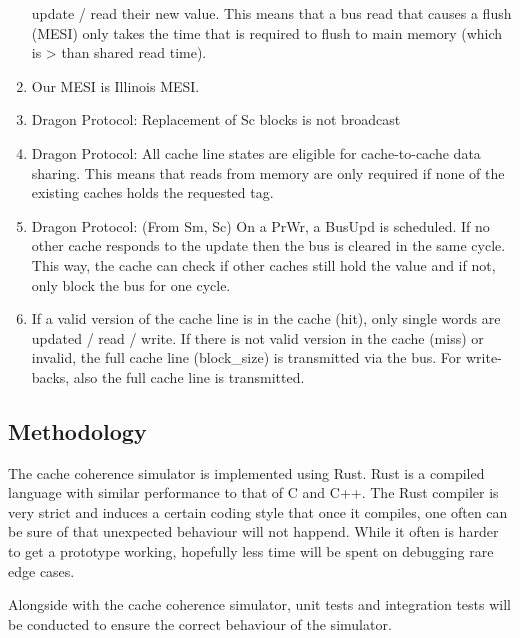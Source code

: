 \begin{enumerate}
          update / read their new value. This means that a bus read that causes a flush (MESI) only takes the
          time that is required to flush to main memory (which is > than shared read time).
    \item Our MESI is Illinois MESI.
    \item Dragon Protocol: Replacement of Sc blocks is not broadcast
    \item Dragon Protocol: All cache line states are eligible for cache-to-cache data sharing. This
          means that reads from memory are only required if none of the existing caches holds the requested
          tag.
    \item Dragon Protocol: (From Sm, Sc) On a PrWr, a BusUpd is scheduled. If no other cache responds to
          the update then the bus is cleared in the same cycle. This way, the cache can check if other caches
          still hold the value and if not, only block the bus for one cycle.
    \item If a valid version of the cache line is in the cache (hit), only single words are updated /
          read / write. If there is not valid version in the cache (miss) or invalid, the full cache line
          (block\_size) is transmitted via the bus. For write-backs, also the full cache line is transmitted.
\end{enumerate}
\subsection{Methodology}
The cache coherence simulator is implemented using Rust.
Rust is a compiled language with similar performance to that of C and C++.
The Rust compiler is very strict and induces a certain coding style that once it compiles, one often can be sure of that unexpected behaviour will not happend.
While it often is harder to get a prototype working, hopefully less time will be spent on debugging rare edge cases.


Alongside with the cache coherence simulator, unit tests and integration tests will be conducted to ensure the correct behaviour of the simulator.

